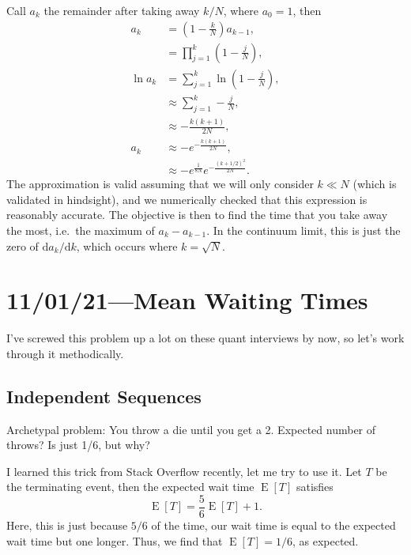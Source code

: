 \documentclass[12pt]{report}
\newcommand*{\rdil}[2]{\mathrm{d}#1 / \mathrm{d}#2}
\newcommand*{\p}[1]{\left(#1\right)}
\DeclareMathOperator{\E}{E}
\begin{document}
Call $a_k$ the remainder after taking away $k / N$, where $a_0 = 1$, then
\begin{align*}
    a_k &= \p{1 - \frac{k}{N}}a_{k - 1},\\
        &= \prod_{j = 1}^k\p{1 - \frac{j}{N}},\\
    \ln a_k &= \sum\limits_{j = 1}^k \ln\p{1 - \frac{j}{N}},\\
        &\approx\sum\limits_{j = 1}^k -\frac{j}{N},\\
        &\approx -\frac{k(k + 1)}{2N},\\
    a_k &\approx -e^{-\frac{k(k + 1)}{2N}},\\
        &\approx -e^{\frac{1}{8N}}e^{-\frac{(k + 1/2)^2}{2N}}.
\end{align*}
The approximation is valid assuming that we will only consider $k \ll N$ (which
is validated in hindsight), and we numerically checked that this expression is
reasonably accurate. The objective is then to find the time that you take away
the most, i.e.\ the maximum of $a_k - a_{k - 1}$. In the continuum limit, this
is just the zero of $\rdil{a_k}{k}$, which occurs where $k = \sqrt{N}$.

\chapter{11/01/21---Mean Waiting Times}

I've screwed this problem up a lot on these quant interviews by now, so let's
work through it methodically.

\section{Independent Sequences}

Archetypal problem: You throw a die until you get a 2. Expected number of
throws? Is just 1/6, but why?

I learned this trick from Stack Overflow recently, let me try to use it. Let $T$
be the terminating event, then the expected wait time $\E[T]$ satisfies
\begin{equation}
    \E[T] = \frac{5}{6} \E[T] + 1.
\end{equation}
Here, this is just because $5/6$ of the time, our wait time is equal to the
expected wait time but one longer. Thus, we find that $\E[T] = 1/6$, as
expected.
\end{document}
